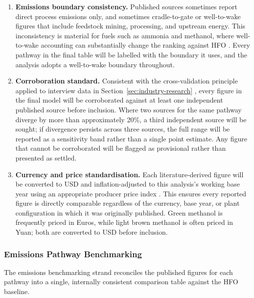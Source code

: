 \documentclass[12pt]{article}
\begin{document}
\begin{enumerate}
    \item \textbf{Emissions boundary consistency.} Published sources sometimes 
    report direct process emissions only, and sometimes cradle-to-gate or 
    well-to-wake figures that include feedstock mining, processing, and upstream 
    energy. This inconsistency is material for fuels such as ammonia and methanol, 
    where well-to-wake accounting can substantially change the ranking against 
    HFO \cite{hydrogen-impact-on-climate}. Every pathway in the final table will 
    be labelled with the boundary it uses, and the analysis adopts a well-to-wake 
    boundary throughout.

    \item \textbf{Corroboration standard.} Consistent with the cross-validation 
    principle applied to interview data in Section~\ref{sec:industry-research} 
    \cite{braun2006,guest2006}, every figure in the final model will be 
    corroborated against at least one independent published source before 
    inclusion. Where two sources for the same pathway diverge by more than 
    approximately 20\%, a third independent source will be sought; if divergence 
    persists across three sources, the full range will be reported as a 
    sensitivity band rather than a single point estimate. Any figure that cannot 
    be corroborated will be flagged as provisional rather than presented as 
    settled.

    \item \textbf{Currency and price standardisation.} Each literature-derived 
    figure will be converted to USD and inflation-adjusted to this analysis's 
    working base year using an appropriate producer price index 
    \cite{iea-electricity-prices}. This ensures every reported figure is directly 
    comparable regardless of the currency, base year, or plant configuration in 
    which it was originally published. Green methanol is frequently priced in 
    Euros, while light brown methanol is often priced in Yuan; both are converted 
    to USD before inclusion.
\end{enumerate}

\subsubsection*{Emissions Pathway Benchmarking}

The emissions benchmarking strand reconciles the published figures for each 
pathway into a single, internally consistent comparison table against the HFO 
baseline.
\end{document}
